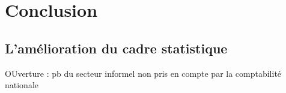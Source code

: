 \documentclass[
]{article}
\begin{document}
\hypertarget{conclusion}{%
\section{Conclusion}\label{conclusion}}

\hypertarget{lamuxe9lioration-du-cadre-statistique}{%
\subsection{L'amélioration du cadre
statistique}\label{lamuxe9lioration-du-cadre-statistique}}

OUverture : pb du secteur informel non pris en compte par la
comptabilité nationale

\printbibliography[title=Bibliography]
\end{document}
